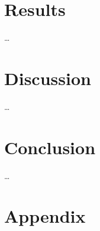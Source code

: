 \documentclass[%
a4paper, 12pt, DIV=calc, BCOR5mm,abstracton]{scrartcl}
\newcounter{SeitenzahlSpeicher}
\begin{document}
\section{Results} \label{ch:Res}
\dots%

\section{Discussion} \label{ch:Disc}
\dots%

\section{Conclusion} \label{ch:Conc}
\dots%

	

\clearpage
{}
\setcounter{page}{\theSeitenzahlSpeicher}
\appendix

\section{Appendix}


	
\newpage
\printbibliography 
%
%
%
%
\end{document}
